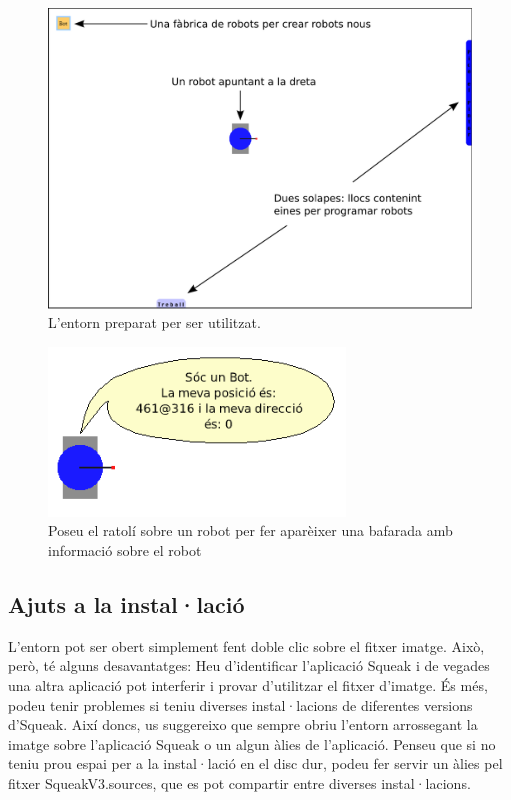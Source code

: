 \newpage

\begin{figure}[h!]
\begin{center}
\includegraphics[scale=0.4]{Imatges/figura1-4}
\end{center}
\caption{L'entorn preparat per ser utilitzat.}
\label{fig0104}
\end{figure}

\vspace*{5mm}

\begin{figure}[h!]
\begin{center}
\includegraphics[height=45mm ,width=79mm ]{Imatges/figura1-5.png}
\end{center}
\caption{Poseu el ratolí sobre un robot per fer aparèixer una bafarada amb informació sobre el robot}
\label{fig0105}
\end{figure}

\newpage

\subsection{Ajuts a la instal·lació}
L'entorn pot ser obert simplement fent doble clic sobre el fitxer imatge. Això, però, té alguns desavantatges: Heu d'identificar l'aplicació \textsf{Squeak} i de vegades una altra aplicació pot interferir i provar d'utilitzar el fitxer d'imatge. És més, podeu tenir problemes si teniu diverses instal·lacions de diferentes versions d'Squeak. Així doncs, us suggereixo que sempre obriu l'entorn arrossegant la imatge sobre l'aplicació \textsf{Squeak} o un algun àlies de l'aplicació.
Penseu que si no teniu prou espai per a la instal·lació en el disc dur, podeu fer servir un àlies pel fitxer \textsf{SqueakV3.sources}, que es pot compartir entre diverses instal·lacions.

